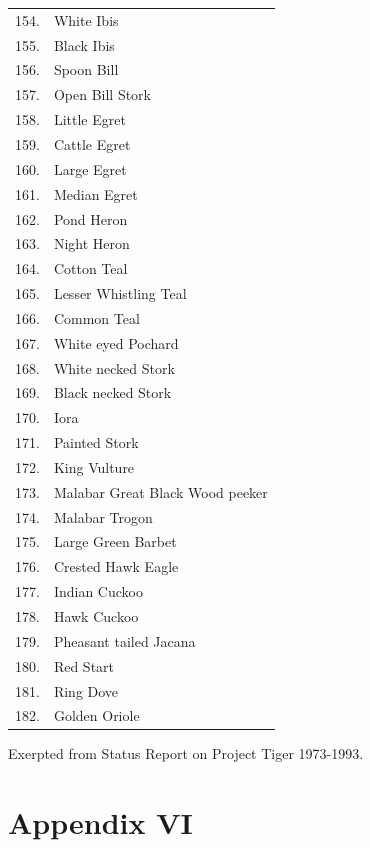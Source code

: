 {\begin{longtable}{cl}
154. & White Ibis \\
155. & Black Ibis \\
156. & Spoon Bill \\
157. & Open Bill Stork \\
158. & Little Egret \\
159. & Cattle Egret \\
160. & Large Egret \\
161. & Median Egret \\
162. & Pond Heron \\
163. & Night Heron \\
164. & Cotton Teal \\
165. & Lesser Whistling Teal \\
166. & Common Teal \\
167. & White eyed Pochard \\
168. & White necked Stork \\
169. & Black necked Stork \\
170. & Iora \\
171. & Painted Stork \\
172. & King Vulture \\
173. & Malabar Great Black Wood peeker \\
174. & Malabar Trogon \\
175. & Large Green Barbet \\
176. & Crested Hawk Eagle \\
177. & Indian Cuckoo \\
178. & Hawk Cuckoo \\
179. & Pheasant tailed Jacana \\
180. & Red Start \\
181. & Ring Dove \\
182. & Golden Oriole
\end{longtable}}

{\centerline{Exerpted from Status Report on Project Tiger 1973-1993.}}


\newpage

\chapter*{Appendix VI}

